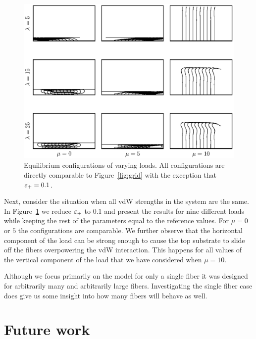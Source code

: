 	\begin{figure}
		\begin{center}
			\includegraphics[scale=1]{./fig/ch4/grid_et0.1.eps}
		\end{center}		
		\caption{Equilibrium configurations of varying loads. All configurations are directly comparable to Figure~\ref{fig:grid} with the exception that $\varepsilon_+ = 0.1$.
		\label{fig:grid_et0.1}}
	\end{figure}

	Next, consider the situation when all vdW strengths in the system are the same. In Figure~\ref{fig:grid_et0.1} we reduce $\varepsilon_+$ to 0.1 and present the results for nine different loads while keeping the rest of the parameters equal to the reference values. For $\mu = 0$ or $5$ the configurations are comparable. We further observe that the horizontal component of the load can be strong enough to cause the top substrate to slide off the fibers overpowering the vdW interaction. This happens for all values of the vertical component of the load that we have considered when $\mu = 10$.
	
	Although we focus primarily on the model for only a single fiber it was designed for arbitrarily many and arbitrarily large fibers. Investigating the single fiber case does give us some insight into how many fibers will behave as well.

\section{Future work}

